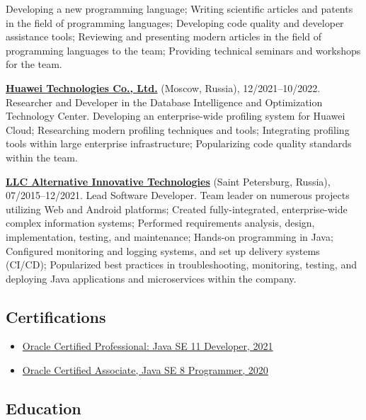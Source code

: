 \documentclass{vl}
\begin{document}
    Developing a new programming language;
    Writing scientific articles and patents in the field of programming languages;
    Developing code quality and developer assistance tools;
    Reviewing and presenting modern articles in the field of programming languages to the team;
    Providing technical seminars and workshops for the team.

    \textbf{\href{https://www.huawei.com}{Huawei Technologies Co., Ltd.}} (Moscow, Russia), 12/2021--10/2022.\newline
    Researcher and Developer in the Database Intelligence and Optimization Technology Center.\newline
    Developing an enterprise-wide profiling system for Huawei Cloud;
    Researching modern profiling techniques and tools;
    Integrating profiling tools within large enterprise infrastructure;
    Popularizing code quality standards within the team.

    \textbf{\href{https://altinntech.com/en/}{LLC Alternative Innovative Technologies}} (Saint Petersburg, Russia), 07/2015--12/2021.
    Lead Software Developer.\newline
    Team leader on numerous projects utilizing Web and Android platforms;
    Created fully-integrated, enterprise-wide complex information systems;
    Performed requirements analysis, design, implementation, testing, and maintenance;
    Hands-on programming in Java;
    Configured monitoring and logging systems, and set up delivery systems (CI/CD);
    Popularized best practices in troubleshooting, monitoring, testing, and deploying Java applications
    and microservices within the company.

    \subsection*{Certifications}

    \begin{itemize}
       \item \href{https://catalog-education.oracle.com/pls/certview/sharebadge?id=87F6A2FE819A5A5AF4120A05900AB28A461EE9A3EE9FBFA02721FADAEB3BCE19}{Oracle Certified Professional: Java SE 11 Developer, 2021}
       \item \href{https://www.credly.com/badges/e2d9ddda-20dc-433d-8ab7-18548fd0fd8f/public_url}{Oracle Certified Associate, Java SE 8 Programmer, 2020}
    \end{itemize}

    \subsection*{Education}
\end{document}
